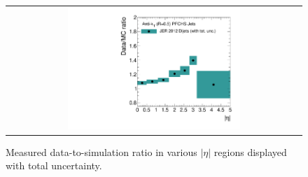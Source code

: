 \begin{figure}[!t]
  \centering
  \begin{tabular}{c}
                \includegraphics[width=0.6\textwidth]{figures/JER_2012_final_combination_v1.pdf}
  \end{tabular}
  \caption{Measured data-to-simulation ratio in various $|\eta|$ regions displayed with total uncertainty.}
  \label{fig:result_2012}
\end{figure}
 
